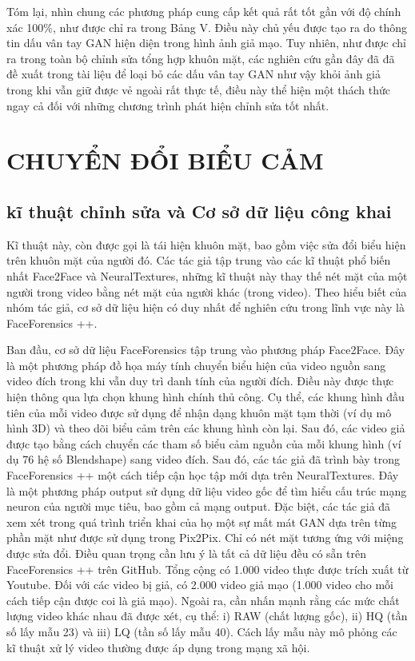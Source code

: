 \documentclass{article}
\begin{document}
Tóm lại, nhìn chung các phương pháp cung cấp kết quả rất tốt gần với độ chính xác 100\%, như được chỉ ra trong Bảng V. Điều này chủ yếu được tạo ra do thông tin dấu vân tay GAN hiện diện trong hình ảnh giả mạo. Tuy nhiên, như được chỉ ra trong toàn bộ chỉnh sửa tổng hợp khuôn mặt, các nghiên cứu gần đây đã đã đề xuất trong tài liệu để loại bỏ các dấu vân tay GAN như vậy khỏi ảnh giả trong khi vẫn giữ được vẻ ngoài rất thực tế, điều này thể hiện một thách thức ngay cả đối với những chương trình phát hiện chỉnh sửa tốt nhất.

\section{CHUYỂN ĐỔI BIỂU CẢM}

\subsection{kĩ thuật chỉnh sửa và Cơ sở dữ liệu công khai}

Kĩ thuật này, còn được gọi là tái hiện khuôn mặt, bao gồm việc sửa đổi biểu hiện trên khuôn mặt của người đó. Các tác giả tập trung vào các kĩ thuật phổ biến nhất Face2Face và NeuralTextures, những kĩ thuật này thay thế nét mặt của một người trong video bằng nét mặt của người khác (trong video). Theo hiểu biết của nhóm tác giả, cơ sở dữ liệu hiện có duy nhất để nghiên cứu trong lĩnh vực này là FaceForensics ++.

Ban đầu, cơ sở dữ liệu FaceForensics tập trung vào phương pháp Face2Face. Đây là một phương pháp đồ họa máy tính chuyển biểu hiện của video nguồn sang video đích trong khi vẫn duy trì danh tính của người đích. Điều này được thực hiện thông qua lựa chọn khung hình chính thủ công. Cụ thể, các khung hình đầu tiên của mỗi video được sử dụng để nhận dạng khuôn mặt tạm thời (ví dụ mô hình 3D) và theo dõi biểu cảm trên các khung hình còn lại. Sau đó, các video giả được tạo bằng cách chuyển các tham số biểu cảm nguồn của mỗi khung hình (ví dụ 76 hệ số Blendshape) sang video đích. Sau đó, các tác giả đã trình bày trong FaceForensics ++ một cách tiếp cận học tập mới dựa trên NeuralTextures. Đây là một phương pháp output sử dụng dữ liệu video gốc để tìm hiểu cấu trúc mạng neuron của người mục tiêu, bao gồm cả mạng output. Đặc biệt, các tác giả đã xem xét trong quá trình triển khai của họ một sự mất mát GAN dựa trên từng phần mặt như được sử dụng trong Pix2Pix. Chỉ có nét mặt tương ứng với miệng được sửa đổi. Điều quan trọng cần lưu ý là tất cả dữ liệu đều có sẵn trên FaceForensics ++ trên GitHub. Tổng cộng có 1.000 video thực được trích xuất từ Youtube. Đối với các video bị giả, có 2.000 video giả mạo (1.000 video cho mỗi cách tiếp cận được coi là giả mạo). Ngoài ra, cần nhấn mạnh rằng các mức chất lượng video khác nhau đã được xét, cụ thể: i) RAW (chất lượng gốc), ii) HQ (tần số lấy mẫu 23) và iii) LQ (tần số lấy mẫu 40). Cách lấy mẫu này mô phỏng các kĩ thuật xử lý video thường được áp dụng trong mạng xã hội.
\end{document}
